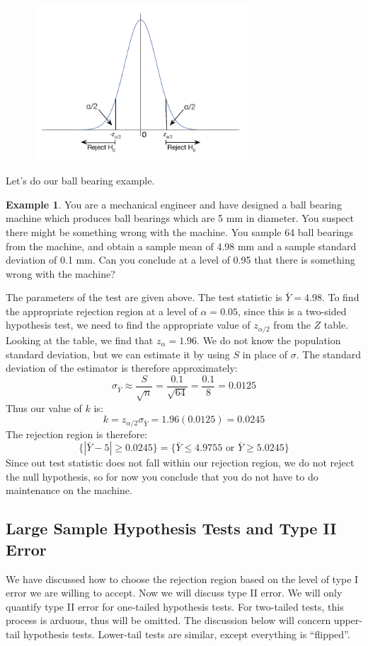\documentclass[12pt]{article}
\theoremstyle{definition}
\newtheorem*{example}{Example}
\theoremstyle{remark}
\begin{document}
\begin{figure}[H]
\centering
\includegraphics[width=8cm]{twotailed}
\end{figure}

Let's do our ball bearing example.

\begin{example}You are a mechanical engineer and have designed a ball bearing machine which produces ball bearings which are 5 mm in diameter. You suspect there might be something wrong with the machine. You sample 64 ball bearings from the machine, and obtain a sample mean of 4.98 mm and a sample standard deviation of 0.1 mm. Can you conclude at a level of 0.95 that there is something wrong with the machine?

The parameters of the test are given above. The test statistic is $\bar{Y} = 4.98$. To find the appropriate rejection region at a level of $\alpha = 0.05$, since this is a two-sided hypothesis test, we need to find the appropriate value of $z_{\alpha/2}$ from the $Z$ table. Looking at the table, we find that $z_\alpha = 1.96$. We do not know the population standard deviation, but we can estimate it by using $S$ in place of $\sigma$. The standard deviation of the estimator is therefore approximately:
\[
\sigma_{\bar{Y}} \approx \frac{S}{\sqrt{n}} = \frac{0.1}{\sqrt{64}} = \frac{0.1}{8} = 0.0125
\]
Thus our value of $k$ is:
\[
k = z_{\alpha/2} \sigma_{\bar{Y}} = 1.96 (0.0125) = 0.0245
\]
The rejection region is therefore:
\[
\{ |\bar{Y} - 5 | \geq 0.0245 \} = \{ \bar{Y} \leq 4.9755 \text{ or } \bar{Y} \geq 5.0245 \}
\]
Since out test statistic does not fall within our rejection region, we do not reject the null hypothesis, so for now you conclude that you do not have to do maintenance on the machine.
\end{example}

\subsection{Large Sample Hypothesis Tests and Type II Error}
We have discussed how to choose the rejection region based on the level of type I error we are willing to accept. Now we will discuss type II error. We will only quantify type II error for one-tailed hypothesis tests. For two-tailed tests, this process is arduous, thus will be omitted. The discussion below will concern upper-tail hypothesis tests. Lower-tail tests are similar, except everything is ``flipped''.\\
\end{document}
